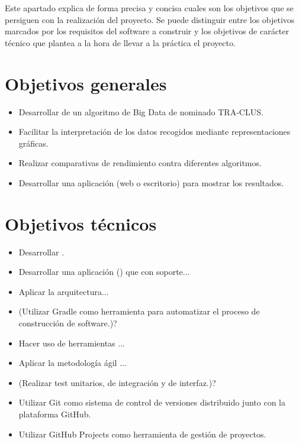 
Este apartado explica de forma precisa y concisa cuales son los objetivos que se persiguen con la realización del proyecto. Se puede distinguir entre los objetivos marcados por los requisitos del software a construir y los objetivos de carácter técnico que plantea a la hora de llevar a la práctica el proyecto.

\section{Objetivos generales}\label{objetivos-generales}

\begin{itemize}
\tightlist
\item
  Desarrollar de un algoritmo de Big Data de nominado TRA-CLUS.
\item
  Facilitar la interpretación de los datos recogidos mediante
  representaciones gráficas.
\item
  Realizar comparativas de rendimiento contra diferentes algoritmos.
\item
  Desarrollar una aplicación (web o escritorio) para mostrar los resultados.
\end{itemize}

\section{Objetivos técnicos}\label{objetivos-tecnicos}

\begin{itemize}
\tightlist
\item
  Desarrollar .
\item
  Desarrollar una aplicación () que con soporte...
\item
  Aplicar la arquitectura...
\item
  (Utilizar Gradle como herramienta para automatizar el proceso de
  construcción de software.)?
\item
  Hacer uso de herramientas ...
\item
  Aplicar la metodología ágil ...
\item
  (Realizar test unitarios, de integración y de interfaz.)?
\item
  Utilizar Git como sistema de control de versiones distribuido junto
  con la plataforma GitHub.
\item
  Utilizar GitHub Projects como herramienta de gestión de proyectos.
\end{itemize}

